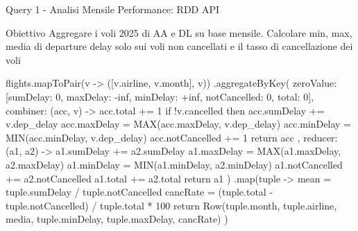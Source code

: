 \documentclass[10pt, aspectratio=169]{beamer}
\newcommand{\queryobjective}[1]{
    \vspace{-0.5cm}
    \begin{exampleblock}{\footnotesize Obiettivo}
    \scriptsize #1
    \end{exampleblock}
    \vfill
}
\begin{document}
\begin{frame}[fragile, t]{Query 1 - Analisi Mensile Performance: RDD API}

    \queryobjective{Aggregare i voli 2025 di AA e DL su base mensile. Calcolare min, max, media di departure delay solo sui voli non cancellati e il tasso di cancellazione dei voli}

    \begin{rddcodebox}
 flights.mapToPair(v -> ([v.airline, v.month], v))
    .aggregateByKey(
        zeroValue: [sumDelay: 0, maxDelay: -inf, minDelay: +inf, notCancelled: 0, total: 0],
        combiner: (acc, v) -> {
            acc.total += 1
            if !v.cancelled then
                acc.sumDelay     += v.dep_delay
                acc.maxDelay     = MAX(acc.maxDelay, v.dep_delay)
                acc.minDelay     = MIN(acc.minDelay, v.dep_delay)
                acc.notCancelled += 1
            return acc
        },
        reducer: (a1, a2) -> {
            a1.sumDelay     += a2.sumDelay
            a1.maxDelay     = MAX(a1.maxDelay, a2.maxDelay)
            a1.minDelay     = MIN(a1.minDelay, a2.minDelay)
            a1.notCancelled += a2.notCancelled
            a1.total        += a2.total
            return a1
        })
    .map(tuple -> {
        mean = tuple.sumDelay / tuple.notCancelled
        cancRate = (tuple.total - tuple.notCancelled) / tuple.total * 100
        return Row(tuple.month, tuple.airline, media, tuple.minDelay, tuple.maxDelay, cancRate)
    })
    \end{rddcodebox}

\end{frame}
\end{document}
